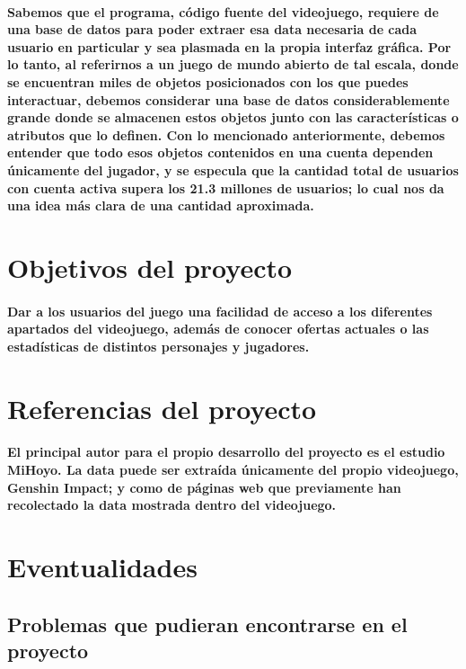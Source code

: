 \documentclass{report}
\begin{document}
\paragraph{Sabemos que el programa, código fuente del videojuego, requiere de una base de datos para poder extraer esa data necesaria de cada usuario en particular y sea plasmada en la propia interfaz gráfica. Por lo tanto, al referirnos a un juego de mundo abierto de tal escala, donde se encuentran miles de objetos posicionados con los que puedes interactuar, debemos considerar una base de datos considerablemente grande donde se almacenen estos objetos junto con las características o atributos que lo definen. Con lo mencionado anteriormente, debemos entender que todo esos objetos contenidos en una cuenta dependen únicamente del jugador, y se especula que la cantidad total de usuarios con cuenta activa supera los 21.3 millones de usuarios; lo cual nos da una idea más clara de una cantidad aproximada. }

\section{ Objetivos del proyecto}
\paragraph{Dar a los usuarios del juego una facilidad de acceso a los diferentes apartados del videojuego, además de conocer ofertas actuales o las estadísticas de distintos personajes y jugadores.}

\section{Referencias del proyecto}
\paragraph{El principal autor para el propio desarrollo del proyecto es el estudio MiHoyo. La data puede ser extraída únicamente del propio videojuego, Genshin Impact; y como de páginas web que previamente han recolectado la data mostrada dentro del videojuego. }

\section{Eventualidades}
\subsection{Problemas que pudieran encontrarse en el proyecto}
\end{document}

